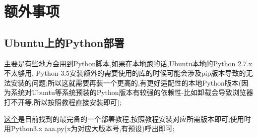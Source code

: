 \section{额外事项}
\subsection{Ubuntu上的Python部署}
主要是有些地方会用到Python脚本,如果在本地跑的话,Ubuntu本地的Python 2.7.x不太够用, Python 3.5安装额外的需要使用的库的时候可能会涉及pip版本导致的无法安装的问题;所以这就需要再装一个更高的,有更好适配性的本地Python版本(因为系统对Ubuntu等系统预装的Python版本有较强的依赖性-比如卸载会导致浏览器打不开等,所以按照教程直接安装即可);\par

\href{https://blog.csdn.net/qq_35743870/article/details/125903040}{这个}是目前找到的最完备的一个部署教程,按照教程安装对应所需版本即可;使用时用Python3.x aaa.py(x为对应大版本号,有预设)呼出即可;
